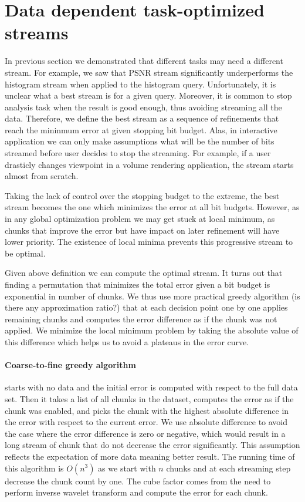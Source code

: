 \section{Data dependent task-optimized streams}
\label{sec:data_dep_streams}

In previous section we demonstrated that different tasks may need a different stream. For example, we saw
that PSNR stream significantly underperforms the histogram stream when applied to the histogram query.
Unfortunately, it is unclear what a best stream is for a given query. Moreover, it is common to stop analysis
task when the result is good enough, thus avoiding streaming all the data. Therefore, we define the best stream as
a sequence of refinements that reach the mininmum error at given stopping bit budget. Alas, in interactive application
we can only make assumptions what will be the number of bits streamed before user decides to stop the streaming. For
example, if a user drasticly changes viewpoint in a volume rendering application, the stream starts almost from scratch.

Taking the lack of control over the stopping budget to the extreme, the best stream becomes the one which minimizes
the error at all bit budgets. However, as in any global optimization problem we may get stuck at local minimum, as
chunks that improve the error but have impact on later refinement will have lower priority. The existence of local
minima prevents this progressive stream to be optimal.

Given above definition we can compute the optimal stream. It turns out that finding a permutation that minimizes
the total error given a bit budget is exponential in number of chunks. We thus use more practical greedy algorithm (is there
any approximation ratio?) that at each decision point one by one applies remaining chunks and computes the error
difference as if the chunk was not applied. We minimize the local minimum problem by taking the absolute value
of this difference which helps us to avoid a plateaus in the error curve.

\paragraph*{Coarse-to-fine greedy algorithm} starts with no data and the initial error is computed with respect
to the full data set. Then it takes a list of all chunks in the dataset, computes the error as if the chunk was
enabled, and picks the chunk with the highest absolute difference in the error with respect to the current error.
We use absolute difference to avoid the case where the error difference is zero or negative, which would result
in a long stream of chunk that do not decrease the error significantly. This assumption reflects the expectation
of more data meaning better result. The running time of this algorithm is $O(n^3)$ as we start with $n$ chunks
and at each streaming step decrease the chunk count by one. The cube factor comes from the need to perform inverse
wavelet transform and compute the error for each chunk.

